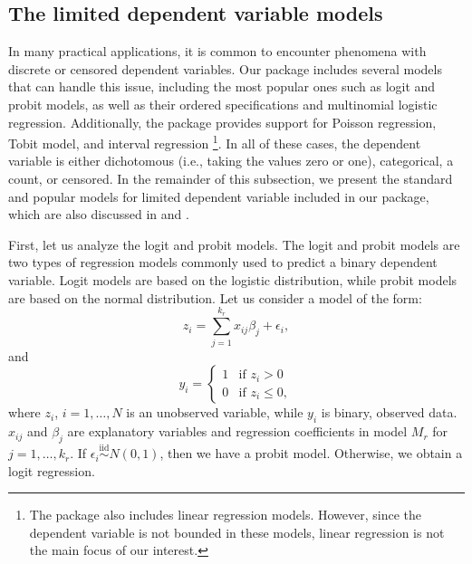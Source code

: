 \subsection{The limited  dependent variable models}
In many practical applications, it is common to encounter
phenomena with discrete or censored dependent variables.
Our  package includes several models that can
handle this issue, including the most popular ones such
as logit and probit models, as well as their ordered
specifications and multinomial logistic regression.
Additionally, the package provides support for Poisson
regression, Tobit model, and interval regression%
\footnote{The  package also includes linear
	regression models. However, since the dependent variable
	is not bounded in these models, linear regression is
	not the main focus of our interest.}.
In all of these cases, the dependent variable is either
dichotomous (i.e., taking the values zero or one),
categorical, a count, or censored.
In the remainder of this subsection, we present the standard
and popular models for limited dependent variable included
in our  package, which are also discussed in
\cite{koop2007bayesian, hosmer:logistic, Winkelmann_2008, verbeek2018guide}
and \cite{cottrell_luchcetti_gretl_manual}.

First, let us analyze the logit and probit models. The logit
and probit models are two types of regression models commonly
used to predict a binary dependent variable. Logit models are
based on the logistic distribution, while probit models are
based on the normal distribution. Let us consider a model of the form:
\begin{equation}
	z_i= \sum_{j=1}^{k_r}x_{ij}\beta_{j} + \epsilon_i, 
\end{equation}
and	
\begin{equation*}	
	y_i= \left \{\begin{array}{ll}
					1 & \text{if } z_i >0 \\
					0 & \text{if } z_i \leq 0,
				\end{array}\right.
\end{equation*}
where $z_i$, $i=1, \dots, N$ is an unobserved variable, while
$y_i$ is binary, observed data. $x_{ij}$ and $\beta_j$ are
explanatory variables and regression coefficients in model
$M_r$ for $j=1,\dots, k_r$.
If $\epsilon_i \overset{\text{iid}}{\sim} N(0, 1)$, then we
have a probit model. Otherwise, we obtain a logit regression.

